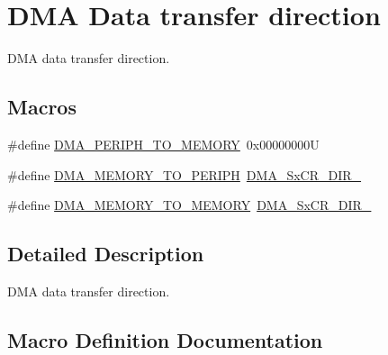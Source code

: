 \hypertarget{group___d_m_a___data__transfer__direction}{}\section{D\+MA Data transfer direction}
\label{group___d_m_a___data__transfer__direction}


D\+MA data transfer direction.  


\subsection*{Macros}
\begin{DoxyCompactItemize}
\item 
\#define \mbox{\hyperlink{group___d_m_a___data__transfer__direction_gacb2cbf03ecae6804ae4a6f60a3e37c12}{D\+M\+A\+\_\+\+P\+E\+R\+I\+P\+H\+\_\+\+T\+O\+\_\+\+M\+E\+M\+O\+RY}}~0x00000000U
\item 
\#define \mbox{\hyperlink{group___d_m_a___data__transfer__direction_ga9e76fc559a2d5c766c969e6e921b1ee9}{D\+M\+A\+\_\+\+M\+E\+M\+O\+R\+Y\+\_\+\+T\+O\+\_\+\+P\+E\+R\+I\+PH}}~\mbox{\hyperlink{group___peripheral___registers___bits___definition_gadca9547536f3d2f76577275964b4875e}{D\+M\+A\+\_\+\+Sx\+C\+R\+\_\+\+D\+I\+R\+\_}}
\item 
\#define \mbox{\hyperlink{group___d_m_a___data__transfer__direction_ga0695035d725855ccf64d2d8452a33810}{D\+M\+A\+\_\+\+M\+E\+M\+O\+R\+Y\+\_\+\+T\+O\+\_\+\+M\+E\+M\+O\+RY}}~\mbox{\hyperlink{group___peripheral___registers___bits___definition_gac52c8d6ecad03bfe531867fa7457f2ae}{D\+M\+A\+\_\+\+Sx\+C\+R\+\_\+\+D\+I\+R\+\_}}
\end{DoxyCompactItemize}


\subsection{Detailed Description}
D\+MA data transfer direction. 



\subsection{Macro Definition Documentation}
\mbox{\label{group___d_m_a___data__transfer__direction_ga0695035d725855ccf64d2d8452a33810}} 

